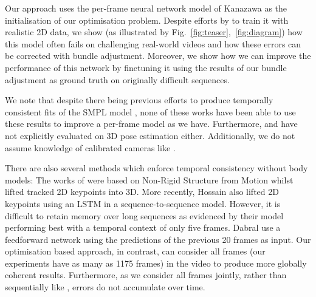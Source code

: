 \documentclass[10pt,twocolumn,letterpaper]{article}
\begin{document}
Our approach uses the per-frame neural network 
model of Kanazawa \etal \cite{kanazawa_cvpr_2018} as the initialisation of our optimisation problem.
Despite efforts by \cite{kanazawa_cvpr_2018} to train it with realistic 2D data, we show (as illustrated by Fig.~\ref{fig:teaser},~\ref{fig:diagram}) how this model often fails on challenging real-world videos and how these errors can be corrected with bundle adjustment.
Moreover, we show how we can improve the performance of this network by finetuning it using the results of our bundle adjustment as ground truth on originally difficult sequences.

We note that despite there being previous efforts to produce temporally consistent fits of the SMPL model \cite{huang_3dv_2017, zhang_uist_2018, zanfir_cvpr_2018, peng_tog_2018}, none of these works have been able to use these results to improve a per-frame model as we have.
Furthermore, \cite{zhang_uist_2018} and \cite{peng_tog_2018} have not explicitly evaluated on 3D pose estimation either.
Additionally, we do not assume knowledge of calibrated cameras like \cite{huang_3dv_2017, zanfir_cvpr_2018}.

There are also several methods which enforce temporal consistency without body models:
The works of \cite{gotardo_cvpr_2011, wandt_pami_2016, li_cvpr_2018} were based on Non-Rigid Structure from Motion whilst
\cite{andriluka_cvpr_2010} lifted tracked 2D keypoints into 3D.
More recently, Hossain \etal \cite{hossain_eccv_2018} also lifted 2D keypoints using an LSTM in a sequence-to-sequence \cite{sutskever_nips_2014} model. However, it is difficult to retain memory over long sequences as evidenced by their model performing best with a temporal context of only five frames.
Dabral \etal \cite{dabral_eccv_2018} use a feedforward network using the predictions of the previous 20 frames as input.
Our optimisation based approach, in contrast, can consider all frames (our experiments have as many as 1175 frames) in the video to produce more globally coherent results.
Furthermore, as we consider all frames jointly, rather than sequentially like \cite{dabral_eccv_2018, hossain_eccv_2018}, errors do not accumulate over time.
\end{document}
